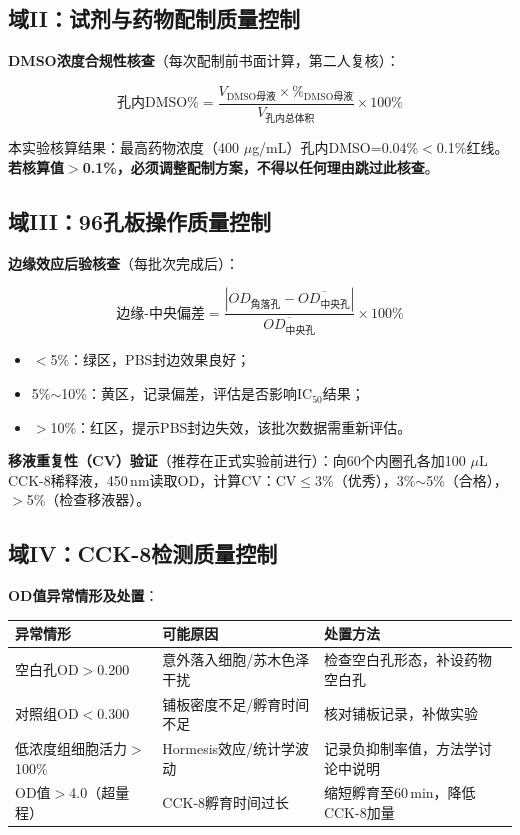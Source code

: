 \documentclass[12pt,a4paper]{article}
\newcommand{\ic}{\ensuremath{\text{IC}_{50}}}
\newcommand{\um}{\,$\mu$g/mL}
\newcommand{\uul}{\,$\mu$L}
\begin{document}
\subsection{域II：试剂与药物配制质量控制}

\textbf{DMSO浓度合规性核查}（每次配制前书面计算，第二人复核）：

\[
\text{孔内DMSO\%} = \frac{V_{\text{DMSO母液}} \times \%_{\text{DMSO母液}}}{V_{\text{孔内总体积}}} \times 100\%
\]

本实验核算结果：最高药物浓度（400\,\um{}）孔内DMSO=0.04\%$<$0.1\%红线。\textbf{若核算值$>$0.1\%，必须调整配制方案，不得以任何理由跳过此核查}\cite{ref23,ref25}。

\subsection{域III：96孔板操作质量控制}

\textbf{边缘效应后验核查}（每批次完成后）：

\[
\text{边缘-中央偏差} = \frac{|OD_{\text{角落孔}} - \overline{OD_{\text{中央孔}}}|}{\overline{OD_{\text{中央孔}}}} \times 100\%
\]

\begin{itemize}
\item $<$5\%：绿区，PBS封边效果良好\cite{ref22}；
\item 5\%$\sim$10\%：黄区，记录偏差，评估是否影响\ic{}结果；
\item $>$10\%：红区，提示PBS封边失效，该批次数据需重新评估。
\end{itemize}

\textbf{移液重复性（CV）验证}（推荐在正式实验前进行）：向60个内圈孔各加100\,\uul{} CCK-8稀释液，450\,nm读取OD，计算CV：CV$\leq$3\%（优秀），3\%$\sim$5\%（合格），$>$5\%（检查移液器）。

\subsection{域IV：CCK-8检测质量控制}

\textbf{OD值异常情形及处置}：

\begin{center}
\begin{tabular}{lll}
\toprule
\rowcolor{tabheadbg}\color{white}\textbf{异常情形} & \color{white}\textbf{可能原因} & \color{white}\textbf{处置方法} \\
\midrule
空白孔OD$>$0.200 & 意外落入细胞/苏木色泽干扰 & 检查空白孔形态，补设药物空白孔 \\
对照组OD$<$0.300 & 铺板密度不足/孵育时间不足 & 核对铺板记录，补做实验 \\
低浓度组细胞活力$>$100\% & Hormesis效应/统计学波动 & 记录负抑制率值，方法学讨论中说明 \\
OD值$>$4.0（超量程）& CCK-8孵育时间过长 & 缩短孵育至60\,min，降低CCK-8加量 \\
\bottomrule
\end{tabular}
\end{center}
\end{document}
